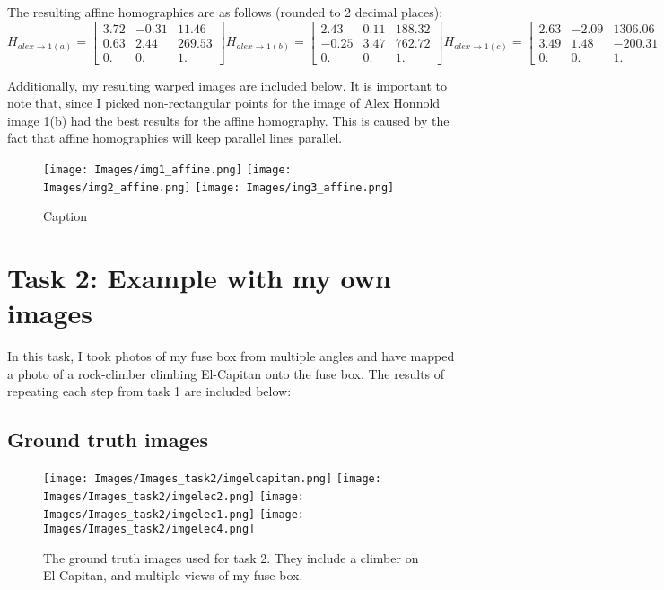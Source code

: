 \documentclass{article}
\begin{document}
The resulting affine homographies are as follows (rounded to 2 decimal places):
\[H_{alex\rightarrow 1(a)} = \begin{bmatrix}
    3.72 &  -0.31 &  11.46 \\
    0.63 & 2.44 & 269.53 \\
    0. & 0. & 1.
\end{bmatrix} H_{alex \rightarrow 1(b)} = \begin{bmatrix}
      2.43 & 0.11 & 188.32 \\
     -0.25 & 3.47 & 762.72 \\
     0. & 0. & 1.
\end{bmatrix} H_{alex \rightarrow 1(c)} = \begin{bmatrix}
    2.63 & -2.09 & 1306.06 \\
    3.49 & 1.48 & -200.31 \\
    0. & 0. & 1.
\end{bmatrix} 
\]

Additionally, my resulting warped images are included below. It is important to note that, since I picked non-rectangular points for the image of Alex Honnold image 1(b) had the best results for the affine homography. This is caused by the fact that affine homographies will keep parallel lines parallel.

\begin{figure}[H]
    \centering
    \texttt{[image: Images/img1\_affine.png]}
    \texttt{[image: Images/img2\_affine.png]}
    \texttt{[image: Images/img3\_affine.png]}
    \caption{Caption}
    \label{fig:enter-label}
\end{figure}


\section{Task 2: Example with my own images}
In this task, I took photos of my fuse box from multiple angles and have mapped a photo of a rock-climber climbing El-Capitan onto the fuse box. The results of repeating each step from task 1 are included below:

\subsection{Ground truth images}
\begin{figure}[H]
    \centering
    \texttt{[image: Images/Images\_task2/imgelcapitan.png]}
    \texttt{[image: Images/Images\_task2/imgelec2.png]}
    \texttt{[image: Images/Images\_task2/imgelec1.png]}
    \texttt{[image: Images/Images\_task2/imgelec4.png]}
    \caption{The ground truth images used for task 2. They include a climber on El-Capitan, and multiple views of my fuse-box.}
    \label{fig:task2-ground-truth}
\end{figure}
\end{document}

